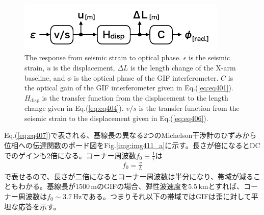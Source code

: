 \begin{figure}[h]
  \centering
  \includegraphics[width=10.0cm]{./img_chap4/img411.png}
  \caption{The response from seismic strain to optical phase. $\epsilon$ is the seismic strain, $u$ is the displacement, $\Delta{L}$ is the length change of the X-arm baseline, and $\phi$ is the optical phase of the GIF interferometer. $C$ is the optical gain of the GIF interferometer given in Eq.(\ref{eq:eq401}). $H_{\mathrm{disp}}$ is the transfer function from the displacement to the length change given in Eq.(\ref{eq:eq404}). $v/s$ is the transfer function from the seismic strain to the displacement given in Eq.(\ref{eq:eq406}). } \label{img:img411}
\end{figure}


Eq.(\ref{eq:eq407})で表される、基線長の異なる2つのMichelson干渉計のひずみから位相への伝達関数のボード図をFig.\ref{img:img411_a}に示す。長さが倍になるとDCでのゲインも2倍になる。コーナー周波数$f_0\equiv \frac{1}{\tau}$は
\begin{eqnarray}
  f_0 = \frac{v}{L}
\end{eqnarray}
で表せるので、長さが二倍になるとコーナー周波数は半分になり、帯域が減ることもわかる。基線長が$1500\,\mathrm{m}$のGIFの場合、弾性波速度を$5.5\,\mathrm{km}$とすれば、コーナー周波数は$f_0\sim3.7\,\mathrm{Hz}$である。つまりそれ以下の帯域ではGIFは歪に対して平坦な応答を示す。

